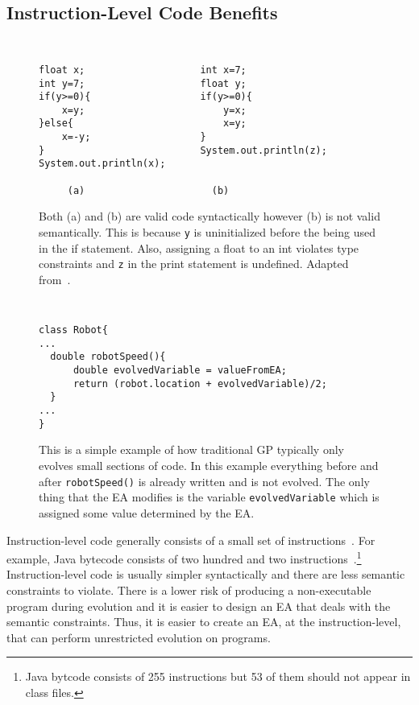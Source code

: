 \documentclass{sig-alternate}
\begin{document}
\subsection{Instruction-Level Code Benefits}
\begin{figure}
\centering
{\tt
\begin{verbatim}
float x;                    int x=7;
int y=7;                    float y;
if(y>=0){                   if(y>=0){
    x=y;                        y=x;
}else{                          x=y;
    x=-y;                   }
}                           System.out.println(z);
System.out.println(x);	
     
     (a)                      (b)

\end{verbatim}
}
\caption{Both (a) and (b) are valid code syntactically however (b) is not valid semantically. This is because \texttt{y} is uninitialized before the being used in the if statement. Also, assigning a float to an int violates type constraints and \texttt{z} in the print statement is undefined. Adapted from~\cite{FINCH:2011}.}
\label{semantics}
\end{figure}

\begin{figure}
\centering
{\tt
\begin{verbatim}
class Robot{	
...
  double robotSpeed(){	
      double evolvedVariable = valueFromEA;
      return (robot.location + evolvedVariable)/2;
  }
...
}

\end{verbatim}
}
\caption{This is a simple example of how traditional GP typically only evolves small sections of code. In this example everything before and after \texttt{robotSpeed()} is already written and is not evolved. The only thing that the EA modifies is the variable \texttt{evolvedVariable} which is assigned some value determined by the EA.}
\label{traditional}
\end{figure}


Instruction-level code generally consists of a small set of instructions~\cite{Assembly:2010}. For example, Java bytecode consists of two hundred and two instructions~\cite{JVMspec:2013}.\footnote{Java bytcode consists of 255 instructions but 53 of them should not appear in class files.} Instruction-level code is usually simpler syntactically and there are less semantic constraints to violate. There is a lower risk of producing a non-executable program during evolution and it is easier to design an EA that deals with the semantic constraints. Thus, it is easier to create an EA, at the instruction-level, that can perform unrestricted evolution on programs.\par
\end{document}
